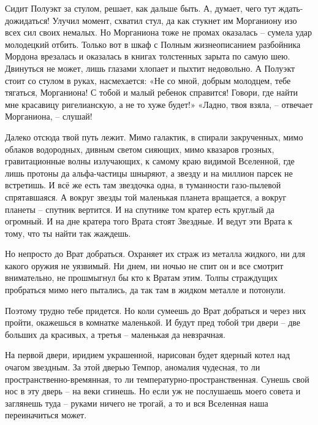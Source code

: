 \documentclass[ebook,oneside,final,openright]{memoir}
\begin{document}
\par
Сидит Полуэкт за стулом, решает, как дальше быть. А, думает, чего тут ждать-дожидаться! Улучил момент, схватил стул, да как стукнет им Морганиону изо всех сил своих немалых. Но Морганиона тоже не промах оказалась – сумела удар молодецкий отбить. Только вот в шкаф с Полным жизнеописанием разбойника Мордона врезалась и оказалась в книгах толстенных зарыта по самую шею. Двинуться не может, лишь глазами хлопает и пыхтит недовольно. А Полуэкт стоит со стулом в руках, насмехается: «Не со мной, добрым молодцем, тебе тягаться, Морганиона! С тобой и малый ребенок справится! Говори, где найти мне красавицу ригелианскую, а не то хуже будет!» «Ладно, твоя взяла, – отвечает Морганиона, – слушай!\par
\par
Далеко отсюда твой путь лежит. Мимо галактик, в спирали закрученных, мимо облаков водородных, дивным светом сияющих, мимо квазаров грозных, гравитационные волны излучающих, к самому краю видимой Вселенной, где лишь протоны да альфа-частицы шныряют, а звезду и на миллион парсек не встретишь. И всё же есть там звездочка одна, в туманности газо-пылевой спрятавшаяся. А вокруг звезды той маленькая планета вращается, а вокруг планеты – спутник вертится. И на спутнике том кратер есть круглый да огромный. И на дне кратера того Врата стоят Звездные. И ведут эти Врата к тому, что ты найти так жаждешь.\par
\par
Но непросто до Врат добраться. Охраняет их страж из металла жидкого, ни для какого оружия не уязвимый. Ни днем, ни ночью не спит он и все смотрит внимательно, не прошмыгнул бы кто к Вратам этим. Толпы страждущих пробраться мимо него пытались, да так там в жидком металле и потонули.\par
\par
Поэтому трудно тебе придется. Но коли сумеешь до Врат добраться и через них пройти, окажешься в комнатке маленькой. И будут пред тобой три двери – две больших да красивых, а третья – маленькая да невзрачная.\par
\par
На первой двери, иридием украшенной, нарисован будет ядерный котел над очагом звездным. За этой дверью Темпор, аномалия чудесная, то ли пространственно-времянная, то ли температурно-пространственная. Сунешь свой нос в эту дверь – на веки сгинешь. Но если уж не послушаешь моего совета и заглянешь туда – руками ничего не трогай, а то и вся Вселенная наша переиначиться может.\par
\end{document}
